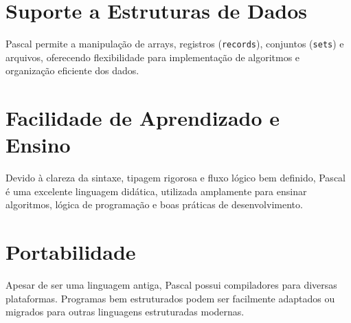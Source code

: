 \documentclass[12pt,a4paper,oneside]{abntex2}
\begin{document}
\section{Suporte a Estruturas de Dados}
Pascal permite a manipulação de arrays, registros (\texttt{records}), conjuntos (\texttt{sets}) e arquivos, oferecendo flexibilidade para implementação de algoritmos e organização eficiente dos dados.

\section{Facilidade de Aprendizado e Ensino}
Devido à clareza da sintaxe, tipagem rigorosa e fluxo lógico bem definido, Pascal é uma excelente linguagem didática, utilizada amplamente para ensinar algoritmos, lógica de programação e boas práticas de desenvolvimento.

\section{Portabilidade}
Apesar de ser uma linguagem antiga, Pascal possui compiladores para diversas plataformas. Programas bem estruturados podem ser facilmente adaptados ou migrados para outras linguagens estruturadas modernas.
\end{document}
